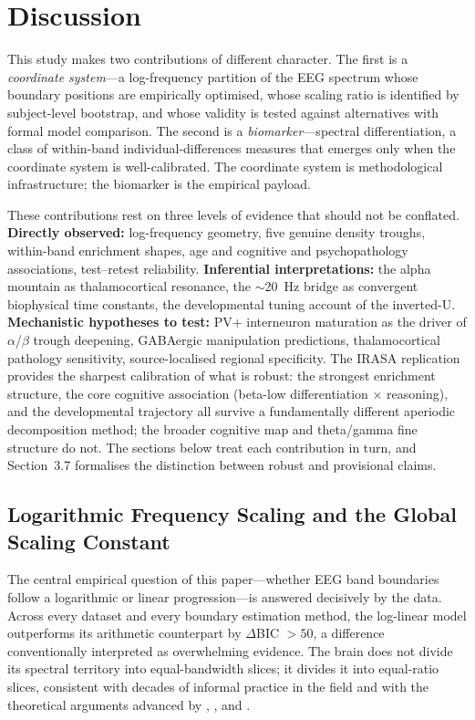 \section{Discussion}

This study makes two contributions of different character. The first is a \emph{coordinate system}---a log-frequency partition of the EEG spectrum whose boundary positions are empirically optimised, whose scaling ratio is identified by subject-level bootstrap, and whose validity is tested against alternatives with formal model comparison. The second is a \emph{biomarker}---spectral differentiation, a class of within-band individual-differences measures that emerges only when the coordinate system is well-calibrated. The coordinate system is methodological infrastructure; the biomarker is the empirical payload.

These contributions rest on three levels of evidence that should not be conflated. \textbf{Directly observed:} log-frequency geometry, five genuine density troughs, within-band enrichment shapes, age and cognitive and psychopathology associations, test--retest reliability. \textbf{Inferential interpretations:} the alpha mountain as thalamocortical resonance, the $\sim$20~Hz bridge as convergent biophysical time constants, the developmental tuning account of the inverted-U. \textbf{Mechanistic hypotheses to test:} PV+ interneuron maturation as the driver of $\alpha$/$\beta$ trough deepening, GABAergic manipulation predictions, thalamocortical pathology sensitivity, source-localised regional specificity. The IRASA replication provides the sharpest calibration of what is robust: the strongest enrichment structure, the core cognitive association (beta-low differentiation $\times$ reasoning), and the developmental trajectory all survive a fundamentally different aperiodic decomposition method; the broader cognitive map and theta/gamma fine structure do not. The sections below treat each contribution in turn, and Section~3.7 formalises the distinction between robust and provisional claims.

\subsection{Logarithmic Frequency Scaling and the Global Scaling Constant}

The central empirical question of this paper---whether EEG band boundaries follow a logarithmic or linear progression---is answered decisively by the data. Across every dataset and every boundary estimation method, the log-linear model outperforms its arithmetic counterpart by $\Delta$BIC $> 50$, a difference conventionally interpreted as overwhelming evidence. The brain does not divide its spectral territory into equal-bandwidth slices; it divides it into equal-ratio slices, consistent with decades of informal practice in the field and with the theoretical arguments advanced by \textcite{penttonen2003natural}, \textcite{pletzer2010golden}, and \textcite{buzsaki2004neuronal}.

